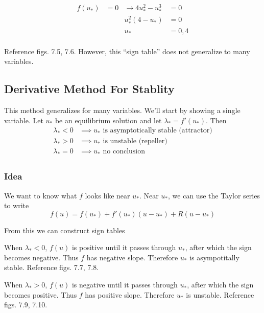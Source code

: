 \documentclass[12pt]{article}
\begin{document}
\begin{equation}
  \begin{aligned}
    f(u_*) &= 0 &\rightarrow 4u_*^2-u_*^3 &= 0 \\
    & & u_*^2(4-u_*) &= 0 \\
    & & u_* &= 0, 4 \\
  \end{aligned}
\end{equation}

Reference figs. 7.5, 7.6. However, this ``sign table'' does not generalize to
many variables.

\subsection{Derivative Method For Stablity}
\label{sec:derivative-method}
This method generalizes for many variables. We'll start by showing a single
variable. Let $u_*$ be an equilibrium solution and let $\lambda_*=f'(u_*)$.
Then
\begin{equation}
  \begin{aligned}
    \lambda_* < 0 &\implies u_* \text{ is asymptotically stable (attractor)} \\
    \lambda_* > 0 &\implies u_* \text{ is unstable (repeller)} \\
    \lambda_* = 0 &\implies u_* \text{ no conclusion} \\
  \end{aligned}
\end{equation}

\subsubsection*{Idea}
We want to know what $f$ looks like near $u_*$. Near $u_*$, we can use the
Taylor series to write
\begin{equation}
  f(u) = f(u_*) + f'(u_*)(u-u_*) + R(u-u_*)
\end{equation}


From this we can construct sign tables

When $\lambda_*<0$, $f(u)$ is positive until it passes through $u_*$, after
which the sign becomes negative. Thus $f$ has negative slope. Therefore $u_*$ is
asympotitally stable. Reference figs. 7.7, 7.8.

When $\lambda_*>0$, $f(u)$ is negative until it passes through $u_*$, after
which the sign becomes positive. Thus $f$ has positive slope. Therefore $u_*$
is unstable. Reference figs. 7.9, 7.10.
\end{document}
